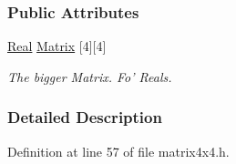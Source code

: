 \subsubsection*{Public Attributes}
\begin{DoxyCompactItemize}
\item 
\hypertarget{classMezzanine_1_1Matrix4x4_ab2743b0013e37a3fc294500e1bbed227}{
\hyperlink{namespaceMezzanine_a726731b1a7df72bf3583e4a97282c6f6}{Real} \hyperlink{classMezzanine_1_1Matrix4x4_ab2743b0013e37a3fc294500e1bbed227}{Matrix} \mbox{[}4\mbox{]}\mbox{[}4\mbox{]}}
\label{classMezzanine_1_1Matrix4x4_ab2743b0013e37a3fc294500e1bbed227}

\begin{DoxyCompactList}\small\item\em The bigger Matrix. Fo' Reals. \item\end{DoxyCompactList}\end{DoxyCompactItemize}


\subsubsection{Detailed Description}


Definition at line 57 of file matrix4x4.h.



